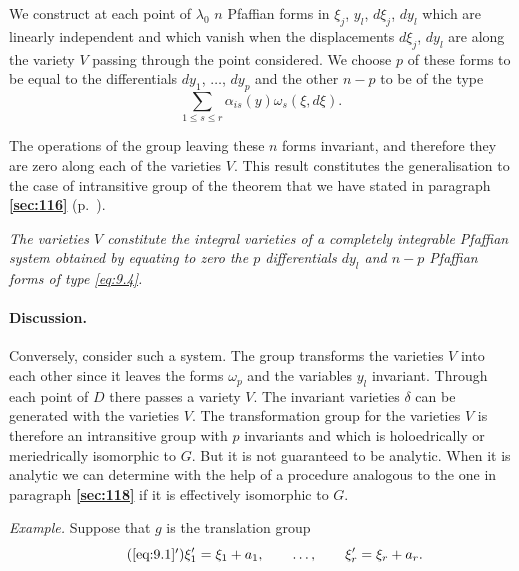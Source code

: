 \documentclass[leqno,11pt]{book}
\numberwithin{equation}{chapter}
\theoremstyle{shape1}
\theoremstyle{shapesmall}
\newcommand{\fsref}[1]{{\rm\textsection\textbf{\ref{sec:#1}}}}
\newcommand{\somespace}{\vspace{9pt}}
\begin{document}
\somespace

We construct at each point of $\lambda_{0}$ $n$ Pfaffian forms in $\xi_{j}$, $y_{l}$, $d\xi_{j}$, $dy_{l}$ which are linearly independent and which vanish when the displacements $d\xi_{j}$, $dy_{l}$ are along the variety $V$ passing through the point considered. We choose $p$ of these forms to be equal to the differentials $dy_{1}$, $\dots$, $dy_{p}$ and the other $n-p$ to be of the type
\begin{equation}
  \label{eq:9.4}
  \sum_{1\le s\le r}\alpha_{is}(y)\omega_{s}(\xi,d\xi).
\end{equation}

The operations of the group leaving these $n$ forms invariant, and therefore they are zero along each of the varieties $V$. This result constitutes the generalisation to the case of intransitive group of the theorem that we have stated in paragraph \fsref{116} (p.~\pageref{sec:116}).

\somespace

\emph{The varieties $V$ constitute the integral varieties of a completely integrable Pfaffian system obtained by equating to zero the $p$ differentials $dy_{l}$ and $n-p$ Pfaffian forms of type \eqref{eq:9.4}.}




\paragraph{Discussion.}
\label{sec:120}
Conversely, consider such a system. The group transforms the varieties $V$ into each other since it leaves the forms $\omega_{p}$ and the variables $y_{l}$ invariant. Through each point of $D$ there passes a variety $V$. The invariant varieties $\delta$ can be generated with the varieties $V$. The transformation group for the varieties $V$ is therefore an intransitive group with $p$ invariants and which is holoedrically or meriedrically isomorphic to $G$. But it is not guaranteed to be analytic. When it is analytic we can determine with the help of a procedure analogous to the one in paragraph \fsref{118} if it is effectively isomorphic to $G$.

\somespace

\emph{Example.} Suppose that $g$ is the translation group
\begin{equation}
  \label{eq:9.1'}\tag{\ref{eq:9.1}$'$}
  \xi'_{1}=\xi_{1}+a_{1},\qquad\dots,\qquad\xi'_{r}=\xi_{r}+a_{r}.
\end{equation}
\end{document}
